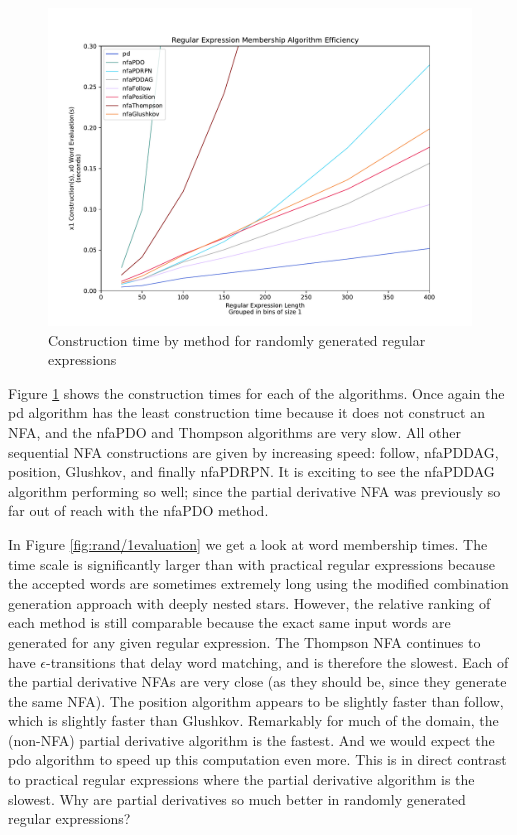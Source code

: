 \begin{figure}[H]
  \center
  \includegraphics[width=0.75\linewidth]{fig/rand/1construction}
  \caption{Construction time by method for randomly generated regular expressions}
  \label{fig:rand/1construction}
\end{figure}

Figure \ref{fig:rand/1construction} shows the construction times for each of the algorithms. Once again the pd algorithm has the least construction time because it does not construct an NFA, and the nfaPDO and Thompson algorithms are very slow. All other sequential NFA constructions are given by increasing speed: follow, nfaPDDAG, position, Glushkov, and finally nfaPDRPN. It is exciting to see the nfaPDDAG algorithm performing so well; since the partial derivative NFA was previously so far out of reach with the nfaPDO method.

In Figure \ref{fig:rand/1evaluation} we get a look at word membership times. The time scale is significantly larger than with practical regular expressions because the accepted words are sometimes extremely long using the modified combination generation approach with deeply nested stars. However, the relative ranking of each method is still comparable because the exact same input words are generated for any given regular expression. The Thompson NFA continues to have $\epsilon$-transitions that delay word matching, and is therefore the slowest. Each of the partial derivative NFAs are very close (as they should be, since they generate the same NFA). The position algorithm appears to be slightly faster than follow, which is slightly faster than Glushkov. Remarkably for much of the domain, the (non-NFA) partial derivative algorithm is the fastest. And we would expect the pdo algorithm to speed up this computation even more. This is in direct contrast to practical regular expressions where the partial derivative algorithm is the slowest. Why are partial derivatives so much better in randomly generated regular expressions?

